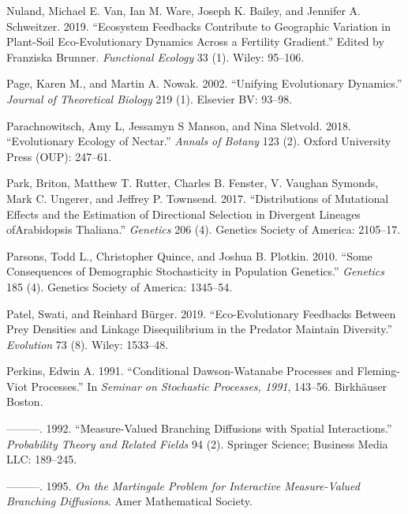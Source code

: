 \documentclass[]{article}
\begin{document}
\leavevmode\hypertarget{ref-VanNuland2019}{}%
Nuland, Michael E. Van, Ian M. Ware, Joseph K. Bailey, and Jennifer A.
Schweitzer. 2019. ``Ecosystem Feedbacks Contribute to Geographic
Variation in Plant-Soil Eco-Evolutionary Dynamics Across a Fertility
Gradient.'' Edited by Franziska Brunner. \emph{Functional Ecology} 33
(1). Wiley: 95--106.

\leavevmode\hypertarget{ref-PAGE2002}{}%
Page, Karen M., and Martin A. Nowak. 2002. ``Unifying Evolutionary
Dynamics.'' \emph{Journal of Theoretical Biology} 219 (1). Elsevier BV:
93--98.

\leavevmode\hypertarget{ref-Parachnowitsch2018}{}%
Parachnowitsch, Amy L, Jessamyn S Manson, and Nina Sletvold. 2018.
``Evolutionary Ecology of Nectar.'' \emph{Annals of Botany} 123 (2).
Oxford University Press (OUP): 247--61.

\leavevmode\hypertarget{ref-Park2017}{}%
Park, Briton, Matthew T. Rutter, Charles B. Fenster, V. Vaughan Symonds,
Mark C. Ungerer, and Jeffrey P. Townsend. 2017. ``Distributions of
Mutational Effects and the Estimation of Directional Selection in
Divergent Lineages ofArabidopsis Thaliana.'' \emph{Genetics} 206 (4).
Genetics Society of America: 2105--17.

\leavevmode\hypertarget{ref-Parsons2010}{}%
Parsons, Todd L., Christopher Quince, and Joshua B. Plotkin. 2010.
``Some Consequences of Demographic Stochasticity in Population
Genetics.'' \emph{Genetics} 185 (4). Genetics Society of America:
1345--54.

\leavevmode\hypertarget{ref-Patel2019}{}%
Patel, Swati, and Reinhard Bürger. 2019. ``Eco-Evolutionary Feedbacks
Between Prey Densities and Linkage Disequilibrium in the Predator
Maintain Diversity.'' \emph{Evolution} 73 (8). Wiley: 1533--48.

\leavevmode\hypertarget{ref-Perkins1991}{}%
Perkins, Edwin A. 1991. ``Conditional Dawson-Watanabe Processes and
Fleming-Viot Processes.'' In \emph{Seminar on Stochastic Processes,
1991}, 143--56. Birkhäuser Boston.

\leavevmode\hypertarget{ref-Perkins1992}{}%
---------. 1992. ``Measure-Valued Branching Diffusions with Spatial
Interactions.'' \emph{Probability Theory and Related Fields} 94 (2).
Springer Science; Business Media LLC: 189--245.

\leavevmode\hypertarget{ref-edwinarendperkins1995}{}%
---------. 1995. \emph{On the Martingale Problem for Interactive
Measure-Valued Branching Diffusions}. Amer Mathematical Society.
\end{document}
